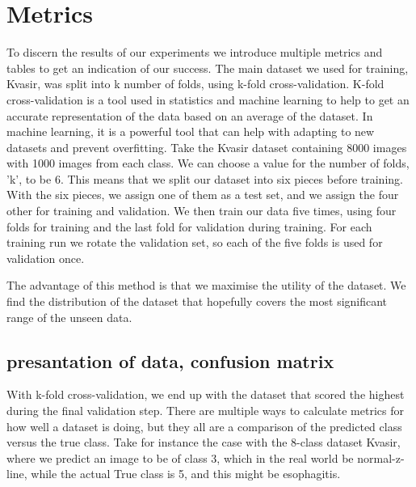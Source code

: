      




\section{Metrics}
To discern the results of our experiments we introduce multiple metrics and tables to get an indication of our success. 
The main dataset we used for training, Kvasir, was split into k number of folds, using k-fold cross-validation. 
K-fold cross-validation is a tool used in statistics and machine learning to help to get an accurate representation of the data based on an average of the dataset.  In machine learning, it is a powerful tool that can help with adapting to new datasets and prevent overfitting. 
Take the Kvasir dataset containing 8000 images with 1000 images from each class. We can choose a value for the number of folds, 'k', to be 6. This means that we split our dataset into six pieces before training.  With the six pieces, we assign one of them as a test set, and we assign the four other for training and validation. We then train our data five times, using four folds for training and the last fold for validation during training. For each training run we rotate the validation set, so each of the five folds is used for validation once. 

The advantage of this method is that we maximise the utility of the dataset. We find the distribution of the dataset that hopefully covers the most significant range of the unseen data. 
\subsection{presantation of data, confusion matrix}
With k-fold cross-validation, we end up with the dataset that scored the highest during the final validation step.  There are multiple ways to calculate metrics for how well a dataset is doing,  but they all are a comparison of the predicted class versus the true class.  
Take for instance the case with the 8-class dataset Kvasir, where we predict an image to be of class 3, which in the real world be normal-z-line, while the actual True class is 5, and this might be esophagitis.

